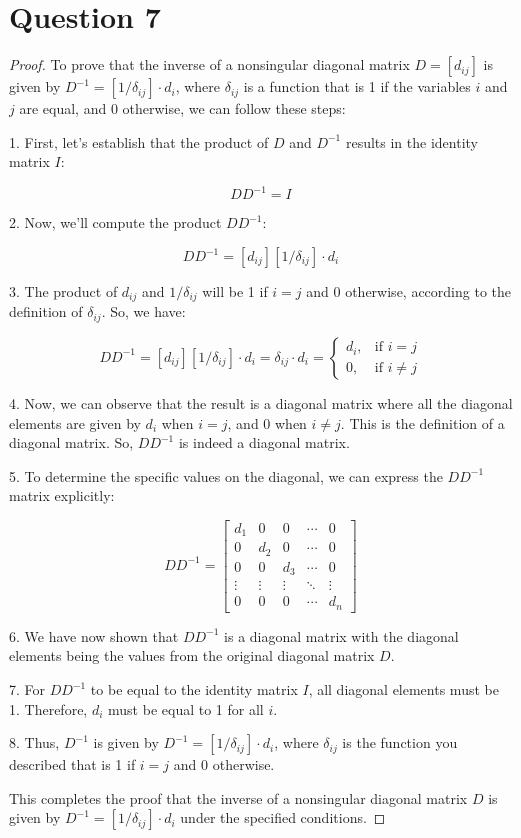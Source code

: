 \section{Question 7}
\begin{proof}
    To prove that the inverse of a nonsingular diagonal matrix $D = [d_{ij}]$ is given by $D^{-1} = [1/\delta_{ij}] \cdot d_i$, where $\delta_{ij}$ is a function that is 1 if the variables $i$ and $j$ are equal, and 0 otherwise, we can follow these steps:
    
    1. First, let's establish that the product of $D$ and $D^{-1}$ results in the identity matrix $I$:
    
    \[
    DD^{-1} = I
    \]
    
    2. Now, we'll compute the product $DD^{-1}$:
    
    \[
    DD^{-1} = [d_{ij}][1/\delta_{ij}] \cdot d_i
    \]
    
    3. The product of $d_{ij}$ and $1/\delta_{ij}$ will be 1 if $i = j$ and 0 otherwise, according to the definition of $\delta_{ij}$. So, we have:
    
    \[
    DD^{-1} = [d_{ij}][1/\delta_{ij}] \cdot d_i = \delta_{ij} \cdot d_i = \begin{cases}
    d_i, & \text{if } i = j \\
    0, & \text{if } i \neq j
    \end{cases}
    \]
    
    4. Now, we can observe that the result is a diagonal matrix where all the diagonal elements are given by $d_i$ when $i = j$, and 0 when $i \neq j$. This is the definition of a diagonal matrix. So, $DD^{-1}$ is indeed a diagonal matrix.
    
    5. To determine the specific values on the diagonal, we can express the $DD^{-1}$ matrix explicitly:
    
    \[
    DD^{-1} = \begin{bmatrix}
    d_1 & 0 & 0 & \cdots & 0 \\
    0 & d_2 & 0 & \cdots & 0 \\
    0 & 0 & d_3 & \cdots & 0 \\
    \vdots & \vdots & \vdots & \ddots & \vdots \\
    0 & 0 & 0 & \cdots & d_n
    \end{bmatrix}
    \]
    
    6. We have now shown that $DD^{-1}$ is a diagonal matrix with the diagonal elements being the values from the original diagonal matrix $D$.
    
    7. For $DD^{-1}$ to be equal to the identity matrix $I$, all diagonal elements must be 1. Therefore, $d_i$ must be equal to 1 for all $i$.
    
    8. Thus, $D^{-1}$ is given by $D^{-1} = [1/\delta_{ij}] \cdot d_i$, where $\delta_{ij}$ is the function you described that is 1 if $i = j$ and 0 otherwise.
    
    This completes the proof that the inverse of a nonsingular diagonal matrix $D$ is given by $D^{-1} = [1/\delta_{ij}] \cdot d_i$ under the specified conditions.
    \end{proof}
    
